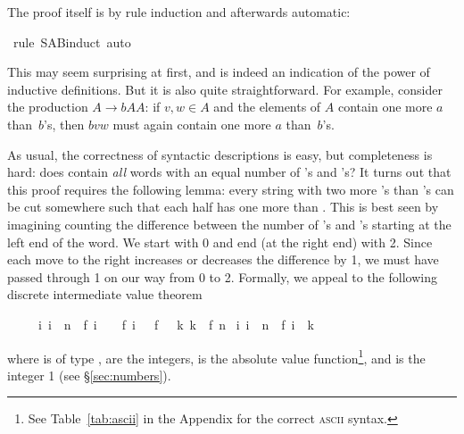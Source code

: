 \begin{isabellebody}
\begin{isamarkuptxt}
The proof itself is by rule induction and afterwards automatic:%
\end{isamarkuptxt}%
\isamarkuptrue%
\isamarkupfalse%
\ {\isacharparenleft}rule\ S{\isacharunderscore}A{\isacharunderscore}B{\isachardot}induct{\isacharcomma}\ auto{\isacharparenright}%
\endisatagproof
{\isafoldproof}%
%
\isadelimproof
%
\endisadelimproof
%
\begin{isamarkuptext}%
\noindent
This may seem surprising at first, and is indeed an indication of the power
of inductive definitions. But it is also quite straightforward. For example,
consider the production $A \to b A A$: if $v,w \in A$ and the elements of $A$
contain one more $a$ than~$b$'s, then $bvw$ must again contain one more $a$
than~$b$'s.

As usual, the correctness of syntactic descriptions is easy, but completeness
is hard: does  contain \emph{all} words with an equal number of
's and 's? It turns out that this proof requires the
following lemma: every string with two more 's than 's can be cut somewhere such that each half has one more  than
. This is best seen by imagining counting the difference between the
number of 's and 's starting at the left end of the
word. We start with 0 and end (at the right end) with 2. Since each move to the
right increases or decreases the difference by 1, we must have passed through
1 on our way from 0 to 2. Formally, we appeal to the following discrete
intermediate value theorem 
\begin{isabelle}%
\ \ \ \ \ {\isasymlbrakk}{\isasymforall}i{\isachardot}\ i\ {\isacharless}\ n\ {\isasymlongrightarrow}\ {\isasymbar}f\ {\isacharparenleft}i\ {\isacharplus}\ {}{\isacharparenright}\ {\isacharminus}\ f\ i{\isasymbar}\ {\isasymle}\ {}{\isacharsemicolon}\ f\ {}\ {\isasymle}\ k{\isacharsemicolon}\ k\ {\isasymle}\ f\ n{\isasymrbrakk}\isanewline
\isaindent{\ \ \ \ \ }{\isasymLongrightarrow}\ {\isasymexists}i{\isachardot}\ i\ {\isasymle}\ n\ {\isasymand}\ f\ i\ {\isacharequal}\ k%
\end{isabelle}
where  is of type ,  are the integers,
\isa{{\isasymbar}{\isachardot}{\isasymbar}} is the absolute value function\footnote{See
Table~\ref{tab:ascii} in the Appendix for the correct \textsc{ascii}
syntax.}, and  is the integer 1 (see \S\ref{sec:numbers}).


\end{isamarkuptext}
\end{isabellebody}
